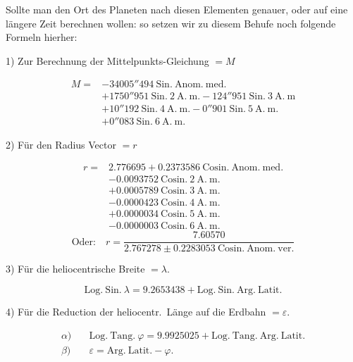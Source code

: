 \par\indent Sollte man den Ort des Planeten nach diesen Elementen genauer, oder auf eine längere Zeit berechnen wollen: so setzen wir zu diesem Behufe noch folgende Formeln hierher:

\begingroup\small
\setlength{\abovedisplayskip}{4pt}\setlength{\belowdisplayskip}{4pt}
\setlength{\abovedisplayshortskip}{3pt}\setlength{\belowdisplayshortskip}{3pt}
\begin{center}1) Zur Berechnung der Mittelpunkts-Gleichung $=M$\end{center}
\[
\begin{aligned}
M={}&-34005''494\ \mathrm{Sin.\ Anom.\ med.}\\
&+1750''951\ \mathrm{Sin.}\ 2\ \mathrm{A.\ m.}-124''951\ \mathrm{Sin.}\ 3\ \mathrm{A.\ m}\\
&+10''192\ \mathrm{Sin.}\ 4\ \mathrm{A.\ m.}-0''901\ \mathrm{Sin.}\ 5\ \mathrm{A.\ m.}\\
&+0''083\ \mathrm{Sin.}\ 6\ \mathrm{A.\ m.}
\end{aligned}
\]
\begin{center}2) Für den Radius Vector $=r$\end{center}
\[
\begin{aligned}
r={}&2.776695+0.2373586\ \mathrm{Cosin.\ Anom.\ med.}\\
&-0.0093752\ \mathrm{Cosin.}\ 2\ \mathrm{A.\ m.}\\
&+0.0005789\ \mathrm{Cosin.}\ 3\ \mathrm{A.\ m.}\\
&-0.0000423\ \mathrm{Cosin.}\ 4\ \mathrm{A.\ m.}\\
&+0.0000034\ \mathrm{Cosin.}\ 5\ \mathrm{A.\ m.}\\
&-0.0000003\ \mathrm{Cosin.}\ 6\ \mathrm{A.\ m.}
\end{aligned}
\]
\[
\text{Oder:}\quad r=\frac{7.60570}{2.767278\pm0.2283053\ \mathrm{Cosin.\ Anom.\ ver.}}
\]
\begin{center}3) Für die heliocentrische Breite $=\lambda$.\end{center}
\[
\mathrm{Log.\ Sin.}\ \lambda=9.2653438+\mathrm{Log.\ Sin.\ Arg.\ Latit.}
\]
\begin{center}4) Für die Reduction der heliocentr.\ Länge auf die Erdbahn $=\varepsilon$.\end{center}
\[
\begin{aligned}
\alpha)&\quad\mathrm{Log.\ Tang.}\ \varphi=9.9925025+\mathrm{Log.\ Tang.\ Arg.\ Latit.}\\
\beta)&\quad\varepsilon=\mathrm{Arg.\ Latit.}-\varphi.
\end{aligned}
\]
